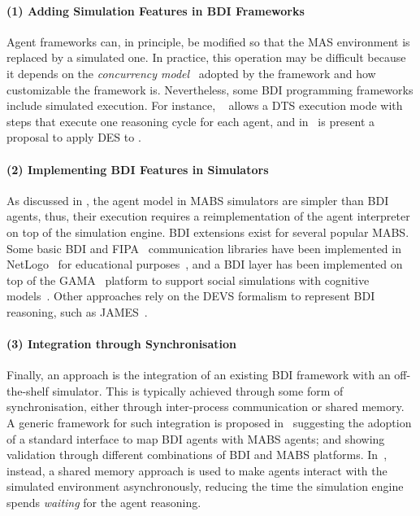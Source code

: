 \newcommand{\relatedExtendFramework}{(1)}
\newcommand{\relatedExtendSimulator}{(2)}
\newcommand{\relatedMiddleware}{(3)}

\paragraph{\relatedExtendFramework{} Adding Simulation Features in \ac{BDI} Frameworks}

Agent frameworks can, in principle,
be modified so that the \ac{MAS} environment is replaced by a simulated one.
%
In practice, this operation may be difficult
because it depends on the \textit{concurrency model}~\cite{BaiardiBCPOR24} adopted by the framework
and how customizable the framework is.
%
Nevertheless,
some \ac{BDI} programming frameworks
include simulated execution.
%
For instance,
\jason{}~\cite{HubnerB09} allows a \ac{DTS} execution mode
with steps that execute one reasoning cycle for each agent,
and in~\cite{ricci_exploiting_2020} is present a proposal to apply \ac{DES} to \jacamo{}.

\paragraph{\relatedExtendSimulator{} Implementing \ac{BDI} Features in Simulators}

As discussed in ,
the agent model in \ac{MABS} simulators are simpler than \ac{BDI} agents,
thus,
their execution requires a reimplementation of the agent interpreter on top of the simulation engine.
%
\ac{BDI} extensions exist for several popular \ac{MABS}.
%
Some basic \ac{BDI} and FIPA~\cite{o1998fipa} communication libraries
have been implemented in NetLogo~\cite{Sklar07}
for educational purposes~\cite{sakellariou_enhancing_2008},
and
a \ac{BDI} layer has been implemented on top of the GAMA~\cite{DrogoulACGGMTVVZ13} platform
to support social simulations with cognitive models~\cite{TaillandierBCAG16}.
%
Other approaches rely on the \ac{DEVS} formalism to represent \ac{BDI} reasoning,
such as JAMES~\cite{uhrmacher1998agents}.

\paragraph{\relatedMiddleware{} Integration through Synchronisation}

Finally,
an approach is the integration of an existing \ac{BDI} framework with an off-the-shelf simulator.
%
This is typically achieved through some form of synchronisation,
either through inter-process communication
or shared memory.
%
A generic framework for such integration is proposed in~\cite{singh_integrating_2016}
suggesting the adoption of a standard interface to map \ac{BDI} agents with \ac{MABS} agents;
and showing validation through different combinations of \ac{BDI} and \ac{MABS} platforms.
%
In~\cite{davoust_architecture_2020},
instead,
a shared memory approach is used to make \jason{} agents interact with the simulated environment asynchronously,
reducing the time the simulation engine spends \emph{waiting} for the agent reasoning.

